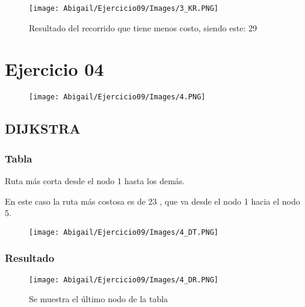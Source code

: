 \documentclass[12pt]{article}
\begin{document}
        \begin{figure}[h!]
          \centering
          \texttt{[image: Abigail/Ejercicio09/Images/3\_KR.PNG]}
          \caption{Resultado del recorrido que tiene menos costo, siendo este: 29}
        \end{figure} 

  
  \section{Ejercicio 04}

    \begin{figure}[h!]
      \centering
      \texttt{[image: Abigail/Ejercicio09/Images/4.PNG]}
    \end{figure} 

    \subsection{DIJKSTRA}

      \subsubsection{Tabla}
        Ruta más corta desde el nodo 1 hasta los demás.
        
        En este caso la ruta más costosa es de 23 , que va desde el nodo 1 hacia el nodo 5.

        \begin{figure}[h!]
          \centering
          \texttt{[image: Abigail/Ejercicio09/Images/4\_DT.PNG]}
        \end{figure} 

      \subsubsection{Resultado}
        \begin{figure}[h!]
          \centering
          \texttt{[image: Abigail/Ejercicio09/Images/4\_DR.PNG]}
          \caption{Se muestra el último nodo de la tabla}
        \end{figure} 
\newpage
\end{document}
